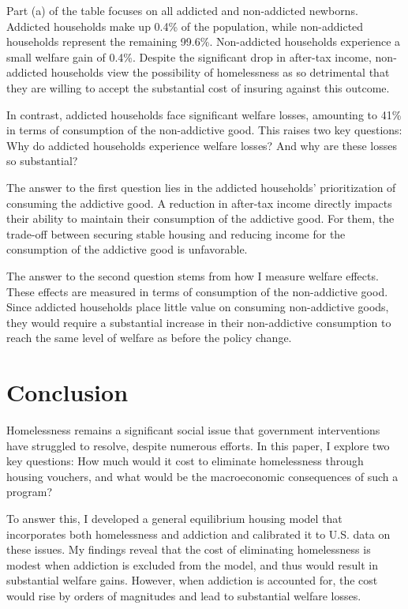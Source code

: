 \documentclass[parskip=full]{article}
\begin{document}
Part (a) of the table focuses on all addicted and non-addicted newborns. Addicted households make up 0.4\% of the population, while non-addicted households represent the remaining 99.6\%. Non-addicted households experience a small welfare gain of 0.4\%. Despite the significant drop in after-tax income, non-addicted households view the possibility of homelessness as so detrimental that they are willing to accept the substantial cost of insuring against this outcome.

In contrast, addicted households face significant welfare losses, amounting to 41\% in terms of consumption of the non-addictive good. This raises two key questions: Why do addicted households experience welfare losses? And why are these losses so substantial?

The answer to the first question lies in the addicted households' prioritization of consuming the addictive good. A reduction in after-tax income directly impacts their ability to maintain their consumption of the addictive good. For them, the trade-off between securing stable housing and reducing income for the consumption of the addictive good is unfavorable.

The answer to the second question stems from how I measure welfare effects. These effects are measured in terms of consumption of the non-addictive good. Since addicted households place little value on consuming non-addictive goods, they would require a substantial increase in their non-addictive consumption to reach the same level of welfare as before the policy change.

\section{Conclusion}

Homelessness remains a significant social issue that government interventions have struggled to resolve, despite numerous efforts. In this paper, I explore two key questions: How much would it cost to eliminate homelessness through housing vouchers, and what would be the macroeconomic consequences of such a program?

To answer this, I developed a general equilibrium housing model that incorporates both homelessness and addiction and calibrated it to U.S. data on these issues. My findings reveal that the cost of eliminating homelessness is modest when addiction is excluded from the model, and thus would result in substantial welfare gains. However, when addiction is accounted for, the cost would rise by orders of magnitudes and lead to substantial welfare losses.
\end{document}
